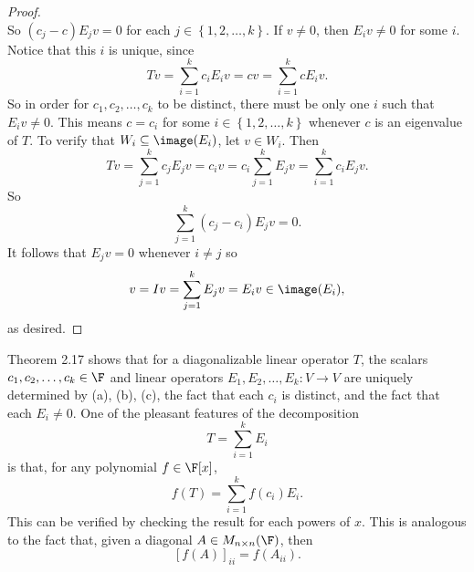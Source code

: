 \documentclass[linearalgebraII]{subfiles}
\begin{document}
\begin{proof}
\begin{equation*}
        \end{equation*}
        So $(c_j-c)E_jv = 0$ for each $j\in \left\lbrace 1, 2, \ldots, k \right\rbrace$. If $v\neq 0$, then $E_iv\neq 0$ for some $i$. Notice that this $i$ is unique, since
        \begin{equation*}
            Tv = \sum^{k}_{i=1} c_iE_iv = cv = \sum^{k}_{i=1} cE_iv.
        \end{equation*}
        So in order for $c_1, c_2, \ldots, c_k$ to be distinct, there must be only one $i$ such that $E_iv\neq 0$. This means $c = c_i$ for some $i\in \left\lbrace 1, 2, \ldots, k \right\rbrace$ whenever $c$ is an eigenvalue of $T$. To verify that $W_i\subseteq \image(E_i)$, let $v\in W_i$. Then
        \begin{equation*}
            Tv = \sum^{k}_{j=1} c_jE_jv = c_iv = c_i \sum^{k}_{j=1} E_jv = \sum^{k}_{i=1} c_iE_jv.
        \end{equation*}
        So
        \begin{equation*}
            \sum^{k}_{j=1} \left( c_j - c_i \right) E_jv = 0. 
        \end{equation*}
        It follows that $E_jv = 0$ whenever $i\neq j$ so
        \begin{equation*}
            v = Iv = \sum^{k}_{j=1} E_jv = E_iv \in \image(E_i),
        \end{equation*}
        as desired.
    \end{proof}

    \begin{remark}
        Theorem 2.17 shows that for a diagonalizable linear operator $T$, the scalars $c_1, c_2, \ldots, c_k\in \F$ and linear operators $E_1, E_2, \ldots, E_k:V\to V$ are uniquely determined by (a), (b), (c), the fact that each $c_i$ is distinct, and the fact that each $E_i\neq 0$. One of the pleasant features of the decomposition
        \begin{equation*}
            T = \sum^{k}_{i=1} E_i
        \end{equation*}
        is that, for any polynomial $f\in \F[x]$,
        \begin{equation*}
            f(T) = \sum^{k}_{i=1} f(c_i)E_i.
        \end{equation*}
        This can be verified by checking the result for each powers of $x$. This is analogous to the fact that, given a diagonal $A\in M_{n\times n}(\F)$, then
        \begin{equation*}
            \left[ f(A) \right] _{ii} = f(A_{ii}).
        \end{equation*}
    \end{remark}
\end{document}
